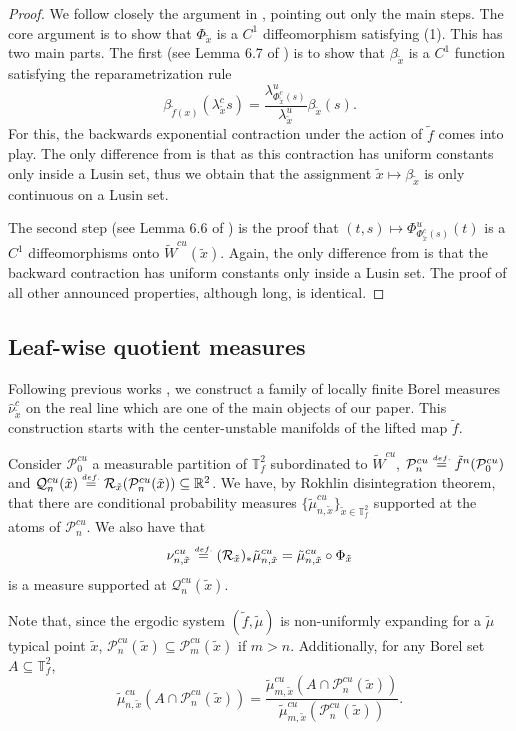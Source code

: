 \documentclass[a4paper,11pt,reqno]{amsart}
\def\tW{\widetilde W}
\newcommand{\R}{{\mathbb R}}
\newcommand{\eqdef}{\stackrel{\scriptscriptstyle\textrm def.}{=}}
\newcommand{\tix}{\tilde{x}}
\newcommand{\tif}{\tilde{f}}
\newcommand{\tm}{\tilde{\mu}}
\theoremstyle{definition}
\begin{document}
\begin{proof}
We follow closely the argument in \cite{ALOS}, pointing out only the main steps. The core argument is to show that $\Phi_{\tix}$ is a $C^1$ diffeomorphism satisfying (1). This has two main parts. The first (see Lemma 6.7 of \cite{ALOS}) is to show that $\beta_{\tix}$ is a $C^1$ function satisfying the reparametrization rule
\[
\beta_{\tif(x)}(\lambda^c_{\tix}s)=\frac{\lambda^u_{\Phi^c_{\tix}(s)}}{\lambda^u_{\tix}}\beta_{\tix}(s).
\]
For this, the backwards exponential contraction under the action of $\tif$ comes into play. The only difference from \cite{ALOS} is that as this contraction has uniform constants only inside a Lusin set, thus we obtain that the assignment $\tix\mapsto\beta_{\tix}$ is only continuous on a Lusin set. 

The second step (see Lemma 6.6 of \cite{ALOS}) is the proof that $(t,s)\mapsto\Phi^u_{\Phi^c_{\tix}(s)}(t)$ is a $C^1$ diffeomorphisms onto $\tW^{cu}(\tix)$. Again, the only difference from \cite{ALOS} is that the backward contraction has uniform constants only inside a Lusin set. The proof of all other announced properties, although long, is identical. 
\end{proof}

\subsection{Leaf-wise quotient measures }
\label{sec:leafwise}

Following previous works \cite{BenoistQuintI, BRH, Katz, ALOS}, we construct a family of locally finite Borel measures $\hat{\nu}^c_{\tix}$ on the real line which are one of the main objects of our paper. This construction starts with the center-unstable manifolds of the lifted map $\tilde{f}$.

Consider $\mathcal{P}^{cu}_0$ a measurable partition of $\mathbb{T}^2_f$ subordinated to $\tW^{cu}$, $\mathcal{P}^{cu}_n \eqdef \tilde{f}^n(\mathcal{P}^{cu}_0)$ and $\mathcal{Q}^{cu}_n({\tix}) \eqdef \mathcal{R}_{\tix}(\mathcal{P}^{cu}_n({\tix})) \subseteq \R^2$. We have, by Rokhlin disintegration theorem, that there are conditional probability measures $\{ \tilde{\mu}^{cu}_{n, \tix} \}_{\tix \in \mathbb{T}^2_f}$ supported at the atoms of $\mathcal{P}^{cu}_n$. We also have that $$\nu^{cu}_{n, \tix} \eqdef (\mathcal{R}_{\tilde{x}})_*\tilde{\mu}^{cu}_{n, \tix} = \tilde{\mu}^{cu}_{n, \tix} \circ \Phi_{\tix}$$ is a measure supported at $\mathcal{Q}^{cu}_n(\tix)$.

Note that, since the ergodic system $(\tif,\tm)$ is non-uniformly expanding for a $\tm$ typical point $\tix$, $\mathcal{P}^{cu}_n(\tix) \subseteq \mathcal{P}^{cu}_m(\tix)$ if $m > n$. Additionally, for any Borel set $A \subseteq \mathbb{T}^2_f$,
$$\tilde{\mu}^{cu}_{n, \tix}(A \cap \mathcal{P}^{cu}_{n}(\tix)) = \dfrac{\tilde{\mu}^{cu}_{m, \tix}(A \cap \mathcal{P}^{cu}_{n}(\tix))}{\tilde{\mu}^{cu}_{m, \tix}(\mathcal{P}^{cu}_{n}(\tix))} .$$
\end{document}
